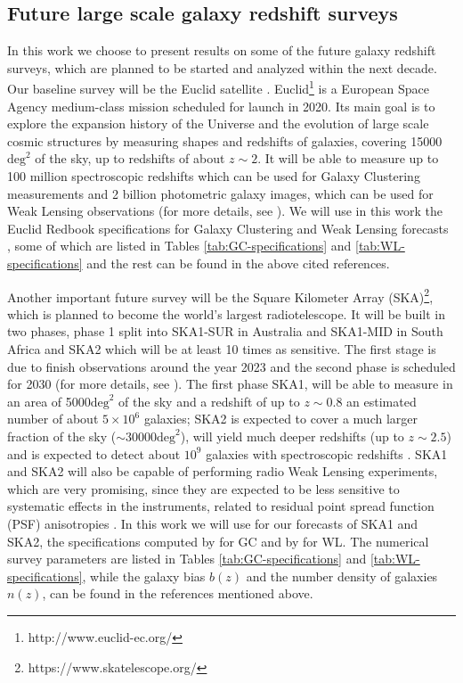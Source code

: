 \subsection{Future large scale galaxy redshift surveys \label{sub:FutureSurveys}}

In this work we choose to present results on some of the future galaxy redshift surveys, which are planned to be started and analyzed within the next decade.
Our baseline survey will be the Euclid satellite \cite{amendola_cosmology_2013, laureijs_euclid_2011}. Euclid\footnote{http://www.euclid-ec.org/} is a European Space Agency medium-class mission scheduled for launch in 2020. Its main goal is to explore the expansion history of the Universe and the evolution of large scale cosmic structures by measuring shapes and redshifts of galaxies, covering 15000$\text{deg}^2$ of the sky, up to redshifts of about $z\sim2$. It will be able to measure up to 100 million spectroscopic redshifts which can be used for Galaxy Clustering measurements and 2 billion photometric galaxy images, which can be used for Weak Lensing observations (for more details, see \cite{amendola_cosmology_2013, laureijs_euclid_2011}). We will use in this work the  Euclid Redbook specifications for Galaxy Clustering and Weak Lensing forecasts \cite{laureijs_euclid_2011}, some of which are listed in Tables \ref{tab:GC-specifications} and \ref{tab:WL-specifications} and the rest can be found in the above cited references.

Another important future survey will be the Square Kilometer Array (SKA)\footnote{https://www.skatelescope.org/}, which is planned to become the world's largest radiotelescope. It will be built in two phases, phase 1 split into SKA1-SUR in Australia and SKA1-MID in South Africa and SKA2 which will be at least 10 times as sensitive. The first stage is due to finish observations around the year 2023 and the second phase is scheduled for 2030 (for more details, see \cite{yahya_cosmological_2015,santos_hi_2015,raccanelli_measuring_2015,bull_measuring_2015}). The first phase SKA1, will be able to measure in an area of 5000$\text{deg}^2$ of the sky and a redshift of up to $z\sim0.8$  an estimated number of about $5\times10^6$ galaxies; SKA2 is expected to cover a much larger fraction of the sky ($\sim$30000$\text{deg}^2$), will yield much deeper redshifts (up to $z\sim2.5$) and is expected to detect about $10^9$ galaxies with spectroscopic redshifts \cite{santos_hi_2015}.
SKA1 and SKA2 will also be capable of performing 
radio Weak Lensing experiments, which are very promising, since they are expected to be less sensitive to systematic effects in the instruments, related to residual point spread function (PSF) anisotropies \cite{harrison_ska_2016}.
In this work we will use for our forecasts of SKA1 and SKA2, the specifications computed by \cite{santos_hi_2015} for GC and by \cite{harrison_ska_2016} for WL. The numerical survey parameters are listed in Tables \ref{tab:GC-specifications} and \ref{tab:WL-specifications}, while the galaxy bias $b(z)$ and the number density of galaxies $n(z)$, can be found in the references mentioned above.

